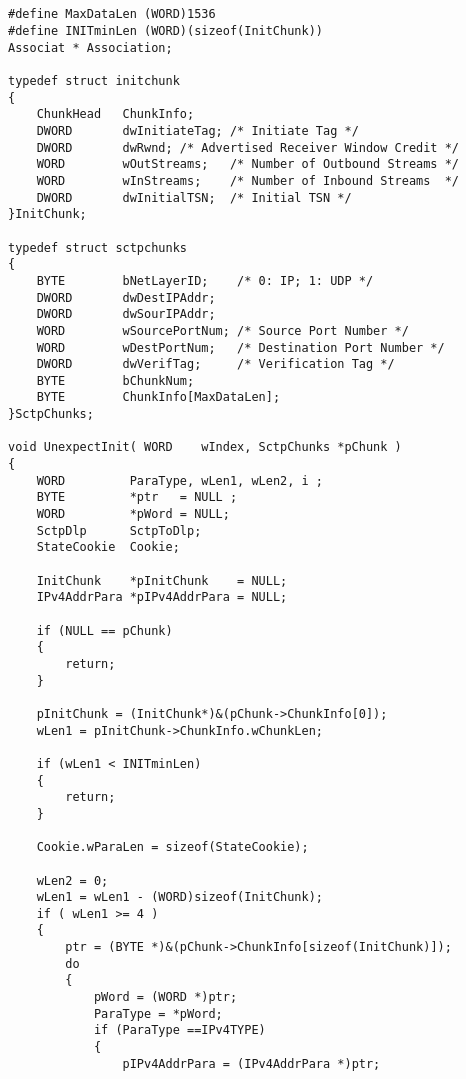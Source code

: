 ﻿\documentclass  [11pt,onecolumn]{article}
\begin{document}
\subsection{}
\begin{lstlisting}
#define MaxDataLen (WORD)1536
#define INITminLen (WORD)(sizeof(InitChunk))
Associat * Association;

typedef struct initchunk
{
    ChunkHead   ChunkInfo;
    DWORD       dwInitiateTag; /* Initiate Tag */
    DWORD       dwRwnd; /* Advertised Receiver Window Credit */
    WORD        wOutStreams;   /* Number of Outbound Streams */
    WORD        wInStreams;    /* Number of Inbound Streams  */
    DWORD       dwInitialTSN;  /* Initial TSN */
}InitChunk;

typedef struct sctpchunks
{
    BYTE        bNetLayerID;    /* 0: IP; 1: UDP */
    DWORD       dwDestIPAddr;
    DWORD       dwSourIPAddr;
    WORD        wSourcePortNum; /* Source Port Number */
    WORD        wDestPortNum;   /* Destination Port Number */
    DWORD       dwVerifTag;     /* Verification Tag */
    BYTE        bChunkNum;
    BYTE        ChunkInfo[MaxDataLen];
}SctpChunks;

void UnexpectInit( WORD    wIndex, SctpChunks *pChunk )
{
    WORD         ParaType, wLen1, wLen2, i ;
    BYTE         *ptr   = NULL ;
    WORD         *pWord = NULL;
    SctpDlp      SctpToDlp;
    StateCookie  Cookie;
     
    InitChunk    *pInitChunk    = NULL;
    IPv4AddrPara *pIPv4AddrPara = NULL;

    if (NULL == pChunk)
    {
        return;
    }

    pInitChunk = (InitChunk*)&(pChunk->ChunkInfo[0]);
    wLen1 = pInitChunk->ChunkInfo.wChunkLen;

    if (wLen1 < INITminLen)
    {
        return;
    }

    Cookie.wParaLen = sizeof(StateCookie);

    wLen2 = 0;
    wLen1 = wLen1 - (WORD)sizeof(InitChunk);
    if ( wLen1 >= 4 )
    {
        ptr = (BYTE *)&(pChunk->ChunkInfo[sizeof(InitChunk)]);
        do
        {
            pWord = (WORD *)ptr;
            ParaType = *pWord;
            if (ParaType ==IPv4TYPE)
            {
                pIPv4AddrPara = (IPv4AddrPara *)ptr;


\end{lstlisting}
\end{document}

